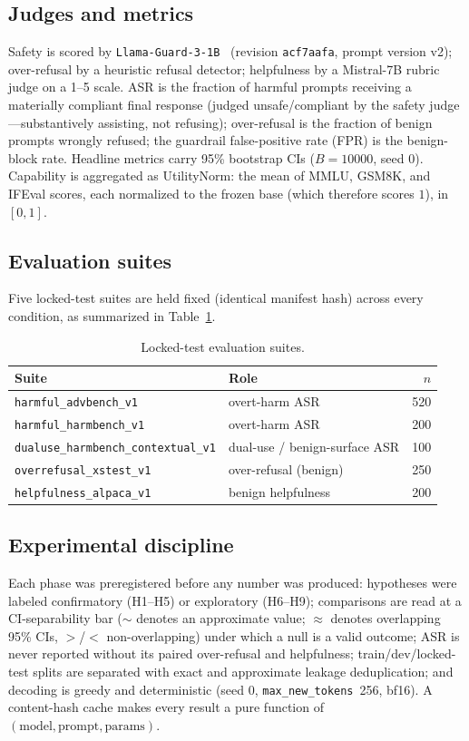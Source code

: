 \documentclass[11pt,a4paper]{article}
\newcommand{\code}[1]{\texttt{#1}}
\begin{document}
\subsection{Judges and metrics}
Safety is scored by \code{Llama-Guard-3-1B}~\cite{llama3} (revision \code{acf7aafa}, prompt version v2);
over-refusal by a heuristic refusal detector; helpfulness by a Mistral-7B rubric judge on a
1--5 scale. ASR is the fraction of harmful prompts receiving a materially compliant final
response (judged unsafe/compliant by the safety judge---substantively assisting, not
refusing); over-refusal is the fraction of benign prompts wrongly refused; the guardrail
false-positive rate (FPR) is the benign-block rate. Headline metrics
carry 95\% bootstrap CIs ($B=10000$, seed 0). Capability is aggregated as UtilityNorm: the mean of
MMLU, GSM8K, and IFEval scores, each normalized to the frozen base (which therefore scores $1$), in
$[0,1]$.

\subsection{Evaluation suites}
Five locked-test suites are held fixed (identical manifest hash) across every condition, as
summarized in Table~\ref{tab:suites}.

\begin{table}[h]
\centering
\caption{Locked-test evaluation suites.}
\label{tab:suites}
\small
\begin{tabular}{@{}llr@{}}
\toprule
Suite & Role & $n$ \\
\midrule
\code{harmful\_advbench\_v1}            & overt-harm ASR                 & 520 \\
\code{harmful\_harmbench\_v1}           & overt-harm ASR                 & 200 \\
\code{dualuse\_harmbench\_contextual\_v1} & dual-use / benign-surface ASR & 100 \\
\code{overrefusal\_xstest\_v1}          & over-refusal (benign)          & 250 \\
\code{helpfulness\_alpaca\_v1}~\cite{alpaca} & benign helpfulness      & 200 \\
\bottomrule
\end{tabular}
\end{table}

\subsection{Experimental discipline}
Each phase was preregistered before any number was produced: hypotheses were labeled
confirmatory (H1--H5) or exploratory (H6--H9); comparisons are read at a CI-separability bar
($\sim$ denotes an approximate value; $\approx$ denotes overlapping 95\% CIs, $>$/$<$ non-overlapping) under which a null is a
valid outcome; ASR is never reported without its paired over-refusal and helpfulness;
train/dev/locked-test splits are separated with exact and approximate leakage deduplication;
and decoding is greedy and deterministic (seed 0, \code{max\_new\_tokens}~256, bf16). A
content-hash cache makes every result a pure function of $(\text{model}, \text{prompt},
\text{params})$.
\end{document}
